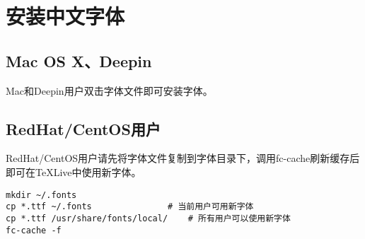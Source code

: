 \section{安装中文字体}

\subsection{Mac OS X、Deepin}

Mac和Deepin用户双击字体文件即可安装字体。

\subsection{RedHat/CentOS用户}

RedHat/CentOS用户请先将字体文件复制到字体目录下，调用fc-cache刷新缓存后即可在TeXLive中使用新字体。

\begin{lstlisting}[basicstyle=\small\ttfamily, numbers=none]
mkdir ~/.fonts
cp *.ttf ~/.fonts				# 当前用户可用新字体
cp *.ttf /usr/share/fonts/local/	# 所有用户可以使用新字体
fc-cache -f
\end{lstlisting}

